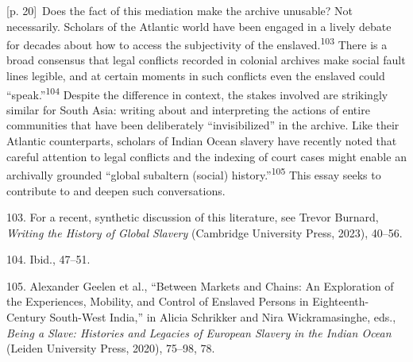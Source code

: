 \documentclass[10pt,a4paper]{article}
\begin{document}
{\scriptsize\color{gray} [p. 20]}\ Does the fact of this mediation make the archive unusable? Not necessarily. Scholars of the Atlantic world have been engaged in a lively debate for decades about how to access the subjectivity of the enslaved.\nobreak\textsuperscript{103} There is a broad consensus that legal conflicts recorded in colonial archives make social fault lines legible, and at certain moments in such conflicts even the enslaved could “speak.”\nobreak\textsuperscript{104} Despite the difference in context, the stakes involved are strikingly similar for South Asia: writing about and interpreting the actions of entire communities that have been deliberately “invisibilized” in the archive. Like their Atlantic counterparts, scholars of Indian Ocean slavery have recently noted that careful attention to legal conflicts and the indexing of court cases might enable an archivally grounded “global subaltern (social) history.”\nobreak\textsuperscript{105} This essay seeks to contribute to and deepen such conversations.\par{\small 103. For a recent, synthetic discussion of this literature, see Trevor Burnard, \textit{Writing the History of Global Slavery} (Cambridge University Press, 2023), 40–56.\par}{\small 104. Ibid., 47–51.\par}{\small 105. Alexander Geelen et al., “Between Markets and Chains: An Exploration of the Experiences, Mobility, and Control of Enslaved Persons in Eighteenth-Century South-West India,” in Alicia Schrikker and Nira Wickramasinghe, eds., \textit{Being a Slave: Histories and Legacies of European Slavery in the Indian Ocean} (Leiden University Press, 2020), 75–98, 78.\par}
\end{document}
